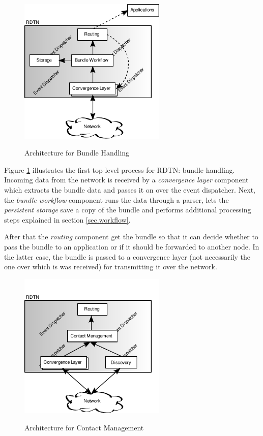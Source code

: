 \documentclass[a4paper]{article}
\begin{document}
\begin{figure}[h]
\begin{center}
\includegraphics[height=7cm]{bundle-architecture.pdf}\\
\caption{\label{fig.bundle-arch} Architecture for Bundle Handling}
\end{center}
\end{figure}

Figure \ref{fig.bundle-arch} illustrates the first top-level process for RDTN:
bundle handling. Incoming data from the network is received by a {\em
convergence layer} component which extracts the bundle data and passes it on
over the event dispatcher. Next, the {\em bundle workflow} component runs the
data through a parser, lets the {\em persistent storage} save a copy of the
bundle and performs additional processing steps explained in section
\ref{sec.workflow}.

After that the {\em routing} component get the bundle so
that it can decide whether to pass the bundle to an application or if it should
be forwarded to another node. In the latter case, the bundle is passed to a
convergence layer (not necessarily the one over which is was received) for
transmitting it over the network.

\begin{figure}[h]
\begin{center}
\includegraphics[height=7cm]{contact-architecture.pdf}\\
\caption{\label{fig.contact-arch} Architecture for Contact Management}
\end{center}
\end{figure}
\end{document}
